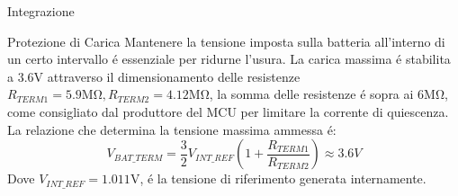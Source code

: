 \begin{section}{Integrazione}
    \begin{subsection}{Protezione di Carica}
        Mantenere la tensione imposta sulla batteria all'interno di un certo intervallo \'e essenziale per ridurne l'usura. La carica massima \'e stabilita a \(3.6\mathrm{V}\) attraverso il dimensionamento delle resistenze \(R_{TERM1}=5.9\mathrm{M\Omega},R_{TERM2}=4.12\mathrm{M\Omega}\), la somma delle resistenze \'e sopra ai \(6\mathrm{M\Omega}\), come consigliato dal produttore del MCU per limitare la corrente di quiescenza. La relazione che determina la tensione massima ammessa \'e:
        \begin{equation*}
            V_{BAT\_TERM} = \frac{3}{2}V_{INT\_REF}\left(1+\frac{R_{TERM1}}{R_{TERM2}}\right) \approx 3.6V
        \end{equation*}
        Dove \(V_{INT\_REF}=1.011\mathrm{V}\), \'e la tensione di riferimento generata internamente.
    \end{subsection}


\end{section}
